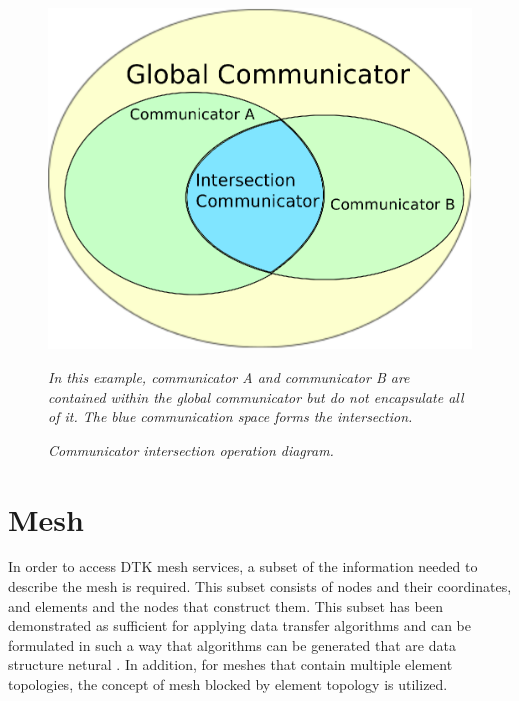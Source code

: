 \documentclass[letterpaper,12pt]{article}
\begin{document}
\begin{figure}[htpb!]
  \centering
  \includegraphics[width=5in]{intersection_comm.eps}
  \caption{\sl Communicator intersection operation diagram.}{\sl In
    this example, communicator A and communicator B are contained
    within the global communicator but do not encapsulate all of
    it. The blue communication space forms the intersection.}
  \label{fig:comm_intersection}
\end{figure}

\clearpage

\section{Mesh}\label{sec:mesh}
In order to access DTK mesh services, a subset of the information
needed to describe the mesh is required. This subset consists of nodes
and their coordinates, and elements and the nodes that construct
them. This subset has been demonstrated as sufficient for applying
data transfer algorithms \cite{Stewart_2004} and can be formulated in
such a way that algorithms can be generated that are data structure
netural \cite{Chand_2008}. In addition, for meshes that contain
multiple element topologies, the concept of mesh blocked by element
topology is utilized. 
\end{document}

